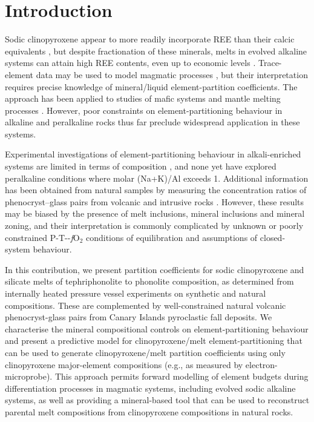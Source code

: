 \documentclass[review,authoryear,12pt]{elsarticle}
\newcommand{\fO}{\textit{f}O$_{2}$ }
\begin{document}
\section{Introduction}
Sodic clinopyroxene appear to more readily incorporate REE than their calcic equivalents \citep{Marks2004}, but despite fractionation of these minerals, melts in evolved alkaline systems can attain high REE contents, even up to economic levels \citep{Kogarko1990,Downes2005,Marks2011,Sjoqvist2013,Goodenough2016,Moller2016}. Trace-element data may be used to model magmatic processes \citep{Spera2001, Troll2002, Boudreau2004,Xu2010,Girnis2013,Mungall2014}, but their interpretation requires precise knowledge of mineral/liquid element-partition coefficients. The approach has been applied to studies of mafic systems and mantle melting processes \citep[][]{Niu2004, Workman2005, Foley2013, Coumans2016, Peters2017}. However, poor constraints on element-partitioning behaviour in alkaline and peralkaline rocks thus far preclude widespread application in these systems.

Experimental investigations of element-partitioning behaviour in alkali-enriched systems are limited in terms of composition \citep{Wood2001cpx, Huang2006}, and none yet have explored peralkaline conditions where molar (Na+K)/Al exceeds 1. Additional information has been obtained from natural samples by measuring the concentration ratios of phenocryst--glass pairs from volcanic and intrusive rocks \citep{Larsen1979, Worner1983, Shearer1994, Severs2009, Fedele2009, Mollo2016}. However, these results may be biased by the presence of melt inclusions, mineral inclusions and mineral zoning, and their interpretation is commonly complicated by unknown or poorly constrained P-T--\fO conditions of equilibration and assumptions of closed-system behaviour.

In this contribution, we present partition coefficients for sodic clinopyroxene and silicate melts of tephriphonolite to phonolite composition, as determined from internally heated pressure vessel experiments on synthetic and natural compositions. These are complemented by well-constrained natural volcanic phenocryst-glass pairs from Canary Islands pyroclastic fall deposits.
We characterise the mineral compositional controls on element-partitioning behaviour and present a predictive model for clinopyroxene/melt element-partitioning that can be used to generate clinopyroxene/melt partition coefficients using only clinopyroxene major-element compositions (e.g., as measured by electron-microprobe). This approach permits forward modelling of element budgets during differentiation processes in magmatic systems, including evolved sodic alkaline systems, as well as providing a mineral-based tool that can be used to reconstruct parental melt compositions from clinopyroxene compositions in natural rocks.
\end{document}
